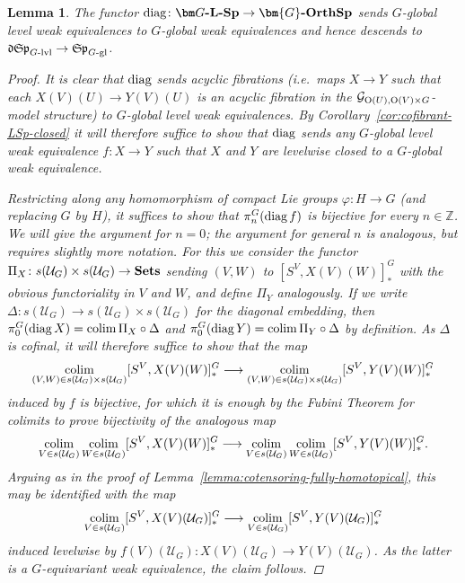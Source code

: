 \documentclass[reqno]{memo-l}
\theoremstyle{mythm}
\newtheorem{lemma}[thm]{Lemma}
\theoremstyle{definition}
\numberwithin{equation}{section}
\newcommand{\Uu}{{\mathcal{U}}}
\newcommand{\Z} {{\mathbb{Z}}}
\renewcommand{\phi}{\varphi}
\newcommand{\cat}[1]{\textbf{\textup{#1}}}
\renewcommand{\O}{{\textup{O}}}
\newcommand{\colim}{\mathop{\textup{colim}}}
\newcommand{\diag}{\textup{diag}}
\newcommand{\mySp}{{\mathfrak S\kern-.5pt\mathfrak p}}
\newcommand{\myLSp}{{\mathfrak d\kern-.25pt}\mySp}
\newcommand{\Gosp}[1]{\cat{$\bm{#1}$-OrthSp}}
\begin{document}
\begin{lemma}
    The functor $\diag\colon\cat{$\bm G$-$\cat{L}$-Sp}\to\Gosp{G}$ sends $G$-global level weak equivalences to $G$-global weak equivalences and hence descends to $\myLSp_\textup{$G$-lvl}\to{\mySp}_\textup{$G$-gl}$.
    \begin{proof}
        It is clear that $\diag$ sends acyclic fibrations (i.e.~maps $X\to Y$ such that each $X(V)(U)\to Y(V)(U)$ is an acyclic fibration in the $\mathcal G_{\O(U),\O(V)\times G}$-model structure) to $G$-global level weak equivalences. By Corollary~\ref{cor:cofibrant-LSp-closed} it will therefore suffice to show that $\diag$ sends any $G$-global level weak equivalence $f\colon X\to Y$ such that $X$ and $Y$ are levelwise closed to a $G$-global weak equivalence. 
        
        Restricting along any homomorphism of compact Lie groups $\phi\colon H\to G$ (and replacing $G$ by $H$), it suffices to show that $\pi_n^G(\diag\,f)$ is bijective for every $n\in\Z$. We will give the argument for $n=0$; the argument for general $n$ is analogous, but requires slightly more notation. For this we consider the functor $\Pi_X\colon s(\Uu_G)\times s(\Uu_G)\to\cat{Sets}$ sending $(V,W)$ to $[S^V, X(V)(W)]_*^G$ with the obvious functoriality in $V$ and $W$, and define $\Pi_Y$ analogously. If we write $\Delta\colon s(\Uu_G)\to s(\Uu_G)\times s(\Uu_G)$ for the diagonal embedding, then $\pi_0^G(\diag\,X)=\colim\Pi_X\circ\Delta$ and $\pi_0^G(\diag\,Y)=\colim\Pi_Y\circ\Delta$ by definition. As $\Delta$ is cofinal, it will therefore suffice to show that the map
        \[
            \colim_{(V,W)\in s(\Uu_G)\times s(\Uu_G)}[S^V,X(V)(W)]_*^G \longrightarrow 
            \colim_{(V,W)\in s(\Uu_G)\times s(\Uu_G)}[S^V,Y(V)(W)]_*^G
        \]
        induced by $f$ is bijective, for which it is enough by the Fubini Theorem for colimits to prove bijectivity of the analogous map
        \[
            \colim_{V\in s(\Uu_G)}\colim_{W\in s(\Uu_G)}[S^V, X(V)(W)]_*^G
            \longrightarrow
            \colim_{V\in s(\Uu_G)}\colim_{W\in s(\Uu_G)}[S^V, Y(V)(W)]_*^G.
        \]
        Arguing as in the proof of Lemma~\ref{lemma:cotensoring-fully-homotopical}, this may be identified with the map
        \[
            \colim_{V\in s(\Uu_G)}[S^V, X(V)(\Uu_G)]_*^G\longrightarrow
            \colim_{V\in s(\Uu_G)}[S^V, Y(V)(\Uu_G)]_*^G
        \]
        induced levelwise by $f(V)(\Uu_G)\colon X(V)(\Uu_G)\to Y(V)(\Uu_G)$. As the latter is a $G$-equivariant weak equivalence, the claim follows.
    \end{proof}
\end{lemma}
\end{document}
